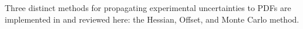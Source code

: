 Three distinct methods for propagating experimental uncertainties to PDFs are implemented in \fitter and reviewed here:
the Hessian, Offset, and Monte Carlo method.
